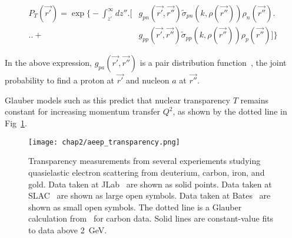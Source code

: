 \begin{equation}
\begin{aligned}
    P_{T}(\vec{r'}) = \exp \biggl\{-\int_{z'}^{\infty} dz'' \biggr.\biggl[&g_{p n}(\vec{r'}, \vec{r''}) \widetilde{\sigma}_{p n}\left(k, \rho(\vec{r''})\right) \rho_{n}(\vec{r''})\biggr.\\
                                                           \biggl.\biggl.+&g_{p p}(\vec{r'}, \vec{r''}) \widetilde{\sigma}_{p p}\left(k, \rho(\vec{r''})\right) \rho_{p}(\vec{r''})\biggr]\biggr\}
\end{aligned}
\end{equation}


In the above expression, $g_{pa}(\vec{r'},\vec{r''})$ is a pair distribution
function~\cite{Schiavilla_1987}, the joint probability to find a proton at
$\vec{r'}$ and nucleon $a$ at $\vec{r''}$.

Glauber models such as this predict that nuclear transparency $T$ remains
constant for increasing momentum transfer $Q^2$, as shown by the dotted line in
Fig~\ref{fig:aeep_transparency_intro}.

\begin{figure}[!h]
    \centering
    \texttt{[image: chap2/aeep\_transparency.png]}
    \caption[Transparency measurements from several experiements studying
             quasielastic electron scattering from deuterium, carbon, iron,
             and gold.]{Transparency measurements from several experiements studying
             quasielastic electron scattering from deuterium, carbon, iron,
             and gold.
             Data taken at JLab~\cite{Abbot_1998, Garrow_2002, Rohe_2005} are shown as solid points.
             Data taken at SLAC~\cite{Makins_1994, ONeill_1995} are shown as large open symbols.
             Data taken at Bates~\cite{Garino_1992} are shown as small open symbols.
             The dotted line is a Glauber calculation from~\cite{Pandharipande_1992} for carbon data.
             Solid lines are constant-value fits to data above \SI{2}{\giga\electronvolt}.
            }
    \label{fig:aeep_transparency_intro}
\end{figure}


